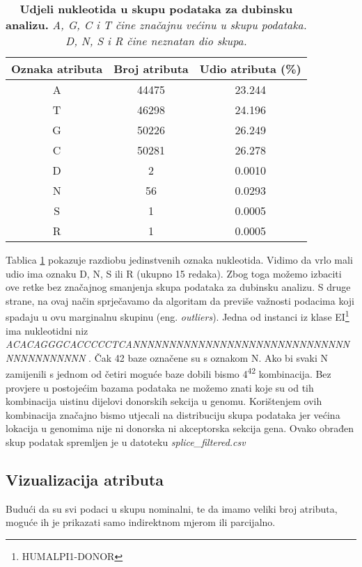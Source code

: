 \begin{table}[!ht]
   \caption[Udjeli nukleotida u skupu podataka za dubinsku analizu]{
   \textbf{Udjeli nukleotida u skupu podataka za dubinsku analizu.} \textit{A, G, C i T čine značajnu većinu u skupu podataka. D, N, S i R čine neznatan dio skupa.}}
   \centering
   \begin{tabular}{||c | c | c ||}
   \hline
   Oznaka atributa & Broj atributa & Udio atributa (\%) \\ [0.5ex]
   \hline\hline
   A & 44475 & 23.244 \\
   T & 46298 & 24.196 \\
   G & 50226 & 26.249 \\
   C & 50281 & 26.278 \\
   D & 2  & 0.0010 \\
   N & 56 & 0.0293 \\
   S & 1  & 0.0005 \\
   R & 1  & 0.0005 \\ [1ex]
   \hline
   \end{tabular}
   \label{tab:udjeli}
\end{table}
Tablica \ref{tab:udjeli} pokazuje razdiobu jedinstvenih oznaka nukleotida. Vidimo da vrlo mali udio ima oznaku D, N, S ili R (ukupno 15 redaka). Zbog toga možemo izbaciti ove retke bez značajnog smanjenja skupa podataka za dubinsku analizu. S druge strane, na ovaj način sprječavamo da algoritam da previše važnosti podacima koji spadaju u ovu marginalnu skupinu (eng. \textit{outliers}). 
Jedna od instanci iz klase EI\footnote{HUMALPI1-DONOR} ima nukleotidni niz\textit{ 
ACACAGGGCACCCCCTCANNNNNNNNNNNNNNNNNNNNNNNNNNNNNNNNNNNNNNNNN
}. Čak 42 baze označene su s oznakom N. Ako bi svaki N zamijenili s jednom od četiri moguće baze dobili bismo 4\textsuperscript{42} kombinacija. Bez provjere u postojećim bazama podataka ne možemo znati koje su od tih kombinacija uistinu dijelovi donorskih sekcija u genomu. Korištenjem ovih kombinacija značajno bismo utjecali na distribuciju skupa podataka jer većina lokacija u genomima nije ni donorska ni akceptorska sekcija gena. 
Ovako obrađen skup podatak spremljen je u datoteku \textit{splice\_filtered.csv}

\subsection{Vizualizacija atributa}
Budući da su svi podaci u skupu nominalni, te da imamo veliki broj atributa, moguće ih je prikazati samo indirektnom mjerom ili parcijalno.

